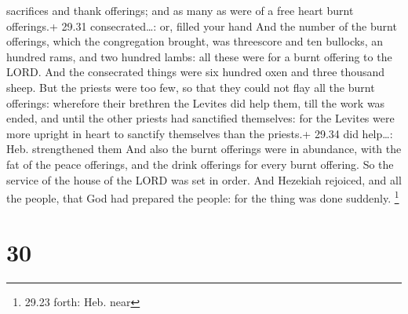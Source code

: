 sacrifices and thank offerings; and as many as were of a free heart
burnt offerings.+ 29.31 consecrated\ldots: or, filled your hand
 And the number of the burnt offerings, which the
congregation brought, was threescore and ten bullocks, an hundred rams,
and two hundred lambs: all these were for a burnt offering to the LORD.
 And the consecrated things were six hundred oxen and three
thousand sheep.  But the priests were too few, so that they
could not flay all the burnt offerings: wherefore their brethren the
Levites did help them, till the work was ended, and until the other
priests had sanctified themselves: for the Levites were more upright in
heart to sanctify themselves than the priests.+ 29.34 did help\ldots:
Heb. strengthened them  And also the burnt offerings were
in abundance, with the fat of the peace offerings, and the drink
offerings for every burnt offering. So the service of the house of the
LORD was set in order.  And Hezekiah rejoiced, and all the
people, that God had prepared the people: for the thing was done
suddenly. \footnote{29.23 forth: Heb. near}

\hypertarget{section-29}{%
\section{30}\label{section-29}}

